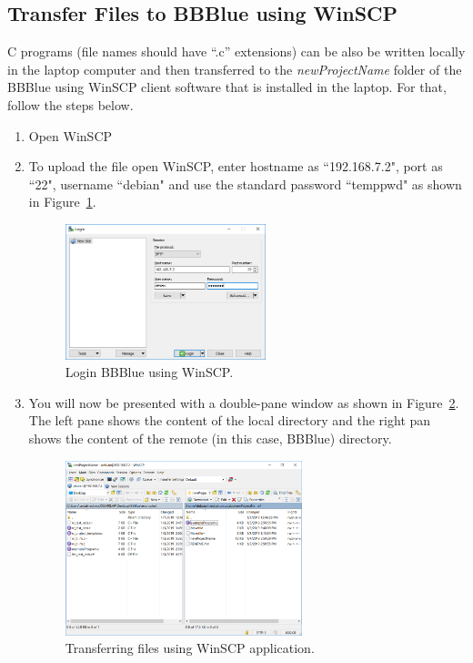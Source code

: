 \subsection{Transfer Files to BBBlue using WinSCP}
C programs (file names should have ``.c'' extensions) can be also be written locally in the laptop computer and then transferred to the \emph{newProjectName} folder of the BBBlue using WinSCP client software that is installed in the laptop. For that, follow the steps below. 
%
\begin{enumerate}
    \item Open WinSCP
    
    \item  To upload the file open WinSCP, enter hostname as ``192.168.7.2", port as ``22", username ``debian" and use the standard password ``temppwd" as shown in Figure~\ref{fig:winSCPlogin}. %
    \begin{figure}
        \centering
        \includegraphics[width= 0.55\textwidth]{figs/img/Lab0/winSCP_login.png}
        \caption{Login BBBlue using WinSCP.}
        \label{fig:winSCPlogin}
    \end{figure}
    
    \item You will now be presented with a double-pane window as shown in Figure~\ref{fig:winApp}. The left pane shows the content of the local directory and the right pan shows the content of the remote (in this case, BBBlue) directory. %
    \begin{figure}
        \centering
        \includegraphics[width= 0.65\textwidth]{figs/img/Lab0/winSCP-C.PNG}        
        \caption{Transferring files using WinSCP application.}
        \label{fig:winApp}
    \end{figure}
    

\end{enumerate}
